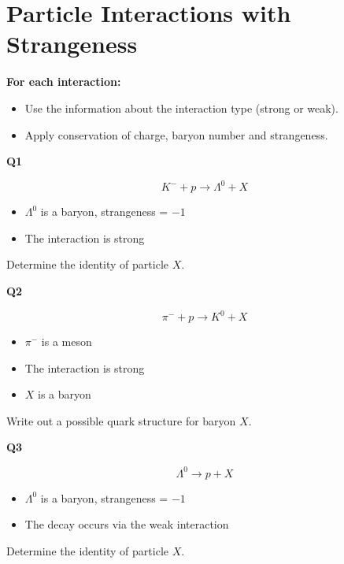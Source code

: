 \documentclass[12pt]{article}
\begin{document}
\section*{Particle Interactions with Strangeness}

\textbf{For each interaction:}

\begin{itemize}
    \item Use the information about the interaction type (strong or weak).
    \item Apply conservation of charge, baryon number and strangeness.
\end{itemize}

\vspace{3em}

\textbf{Q1}

\[
K^- + p \rightarrow \Lambda^0 + X
\]

\begin{itemize}
    \item $\Lambda^0$ is a baryon, strangeness = $-1$
    \item The interaction is strong
\end{itemize}

Determine the identity of particle $X$.

\vspace{3em}

\textbf{Q2}

\[
\pi^- + p \rightarrow K^0 + X
\]

\begin{itemize}
    \item $\pi^-$ is a meson
    \item The interaction is strong
    \item $X$ is a baryon
\end{itemize}

Write out a possible quark structure for baryon $X$.

\vspace{3em}

\textbf{Q3}

\[
\Lambda^0 \rightarrow p + X
\]

\begin{itemize}
    \item $\Lambda^0$ is a baryon, strangeness = $-1$
    \item The decay occurs via the weak interaction
\end{itemize}

Determine the identity of particle $X$.
\end{document}
